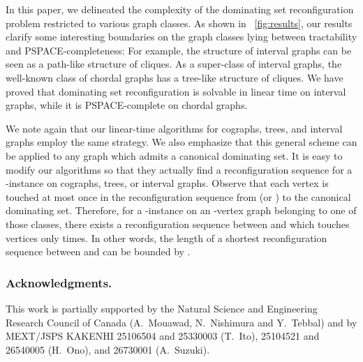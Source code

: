 \documentclass{llncs}
\begin{document}
In this paper, we delineated the complexity of the
{\sc dominating set reconfiguration} problem restricted to various graph classes.
As shown in \figurename~\ref{fig:results}, our results clarify some
interesting boundaries on the graph classes lying between tractability and PSPACE-completeness:
For example, the structure of interval graphs can be seen as a path-like structure of cliques.
As a super-class of interval graphs, the well-known class of chordal graphs has a tree-like structure of cliques.
We have proved that {\sc dominating set reconfiguration} is solvable in
linear time on interval graphs, while it is PSPACE-complete on chordal graphs.

We note again that our linear-time algorithms for cographs, trees, and interval
graphs employ the same strategy. We also emphasize that this general
scheme can be applied to any graph which admits a canonical dominating set.
It is easy to modify our algorithms so that they actually
find a reconfiguration sequence for a -instance  on cographs, trees, or interval graphs.
Observe that each vertex is touched at most once in the
reconfiguration sequence from  (or ) to the canonical dominating set.
Therefore, for a -instance on an -vertex graph belonging to one of those classes, there exists a reconfiguration
sequence between  and  which touches vertices only  times.
In other words, the length of a shortest reconfiguration sequence between  and  can be bounded by .

\subsubsection*{Acknowledgments.}
This work is partially supported by the Natural Science and
Engineering Research Council of Canada (A.~Mouawad, N.~Nishimura and Y.~Tebbal) and
by MEXT/JSPS KAKENHI 25106504 and 25330003 (T.~Ito), 25104521 and 26540005 (H.~Ono), and 26730001 (A.~Suzuki).
\end{document}
